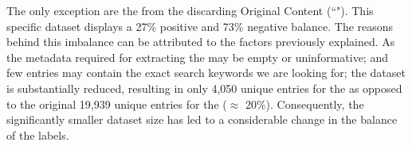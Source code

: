 


The only exception are the \keyphrases{} from the \trafilaturaAbstract{} discarding Original Content (``\keyphrasesAbstractOnly{}"). This specific dataset displays a 27\% positive and 73\% negative balance. The reasons behind this imbalance can be attributed to the factors previously explained. As the metadata required for extracting the \trafilaturaAbstract{} may be empty or uninformative; and few entries may contain the exact search keywords we are looking for; the dataset is substantially reduced, resulting in only 4,050 unique entries for the \keyphrasesAbstractOnly{}  as opposed to the original 19,939  unique entries for the \trafilaturaAbstract{} ($\approx$ 20\%). Consequently, the significantly smaller dataset size has led to a considerable change in the balance of the labels.


